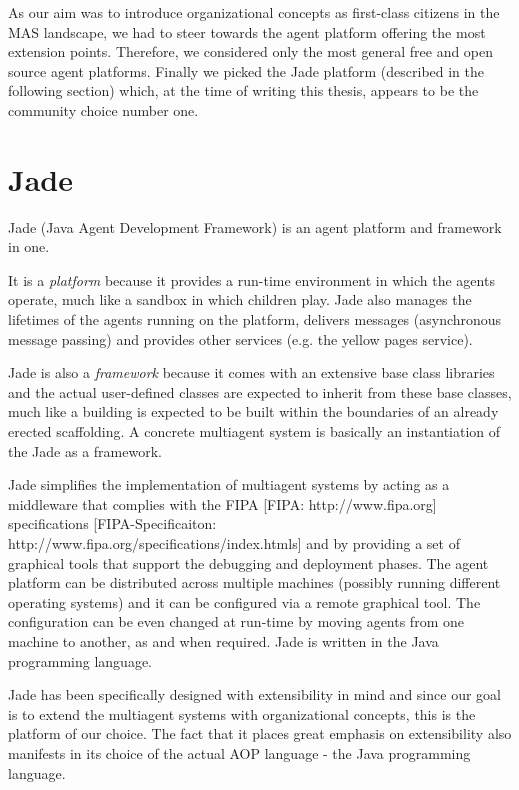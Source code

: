 As our aim was to introduce organizational concepts as first-class citizens in the MAS landscape, we had to steer towards the agent platform offering the most extension points.
Therefore, we considered only the most general free and open source agent platforms.
Finally we picked the Jade platform (described in the following section) which, at the time of writing this thesis, appears to be the community choice number one.  

\section{Jade}

Jade (Java Agent Development Framework) is an agent platform and framework in one.

It is a \textit{platform} because it provides a run-time environment in which the agents operate, much like a sandbox in which children play.
Jade also manages the lifetimes of the agents running on the platform, delivers messages (asynchronous message passing) and provides other services (e.g. the yellow pages service).

Jade is also a \textit{framework} because it comes with an extensive base class libraries and the actual user-defined classes are expected to inherit from these base classes, much like a building is expected to be built within the boundaries of an already erected scaffolding.
A concrete multiagent system is basically an instantiation of the Jade as a framework.

Jade simplifies the implementation of multiagent systems by acting as a middleware that complies with the FIPA
[FIPA: http://www.fipa.org]
specifications
[FIPA-Specificaiton: http://www.fipa.org/specifications/index.htmls] and by providing a set of graphical tools that support the debugging and deployment phases.
The agent platform can be distributed across multiple machines (possibly running different operating systems) and it can be configured via a remote graphical tool.
The configuration can be even changed at run-time by moving agents from one machine to another, as and when required. 
Jade is written in the Java programming language. 

Jade has been specifically designed with extensibility in mind and since our goal is to extend the multiagent systems with organizational concepts, this is the platform of our choice.
The fact that it places great emphasis on extensibility also manifests in its choice of the actual AOP language - the Java programming language.

